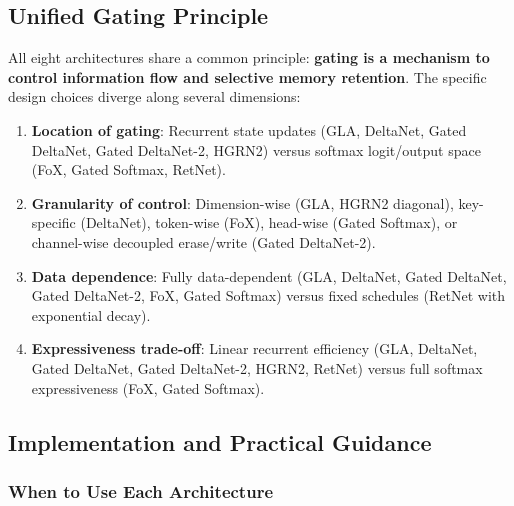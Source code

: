 \subsection{Unified Gating Principle}

All eight architectures share a common principle: \textbf{gating is a mechanism to control information flow and selective memory retention}. The specific design choices diverge along several dimensions:

\begin{enumerate}[leftmargin=*]
    \item \textbf{Location of gating}: Recurrent state updates (GLA, DeltaNet, Gated DeltaNet, Gated DeltaNet-2, HGRN2) versus softmax logit/output space (FoX, Gated Softmax, RetNet).
    \item \textbf{Granularity of control}: Dimension-wise (GLA, HGRN2 diagonal), key-specific (DeltaNet), token-wise (FoX), head-wise (Gated Softmax), or channel-wise decoupled erase/write (Gated DeltaNet-2).
    \item \textbf{Data dependence}: Fully data-dependent (GLA, DeltaNet, Gated DeltaNet, Gated DeltaNet-2, FoX, Gated Softmax) versus fixed schedules (RetNet with exponential decay).
    \item \textbf{Expressiveness trade-off}: Linear recurrent efficiency (GLA, DeltaNet, Gated DeltaNet, Gated DeltaNet-2, HGRN2, RetNet) versus full softmax expressiveness (FoX, Gated Softmax).
\end{enumerate}

\subsection{Implementation and Practical Guidance}

\subsubsection{When to Use Each Architecture}

